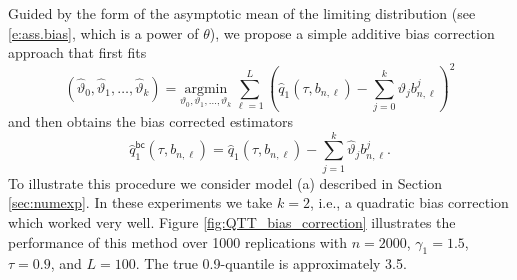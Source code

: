\documentclass[12pt]{amsart}
\newcommand{\1}{\mathbbm{1}}
\newcommand{\0}{\mathbf{0}}
\newcommand{\argmin}{\mathrm{argmin}}
\theoremstyle{plain}
\theoremstyle{definition}
\begin{document}
Guided by the form of the asymptotic mean of the limiting distribution (see \eqref{e:ass.bias}, which is a power of $\theta$), we propose a simple additive bias correction approach that first fits 
%
\begin{equation*}
(\hat\vartheta_0,\hat\vartheta_1,\dots,\hat\vartheta_k)=\underset{\vartheta_0,\vartheta_1,\dots,\vartheta_k}{\argmin}\,\sum_{\ell=1}^L(\hat{q}_{1}(\tau,b_{n,\ell})-\sum_{j=0}^k\vartheta_jb_{n,\ell}^j)^2
\end{equation*}
%
and then obtains the bias corrected estimators
%
\begin{equation}
    \label{eq:debiased_q}
  \hat{q}_{1}^{\mathsf{bc}}(\tau,b_{n,\ell})=  \hat{q}_{1}(\tau,b_{n,\ell})-\sum_{j=1}^k\hat\vartheta_jb_{n,\ell}^j.
\end{equation}
%
To illustrate this procedure we consider model (a)  described in Section \ref{sec:numexp}.  In these experiments we take $k=2$, i.e., a quadratic bias correction which worked very well. Figure \ref{fig:QTT_bias_correction} illustrates the performance of this method over 1000 replications   with $n=2000$, $\gamma_1=1.5$, $\tau=0.9$, and  $L=100$.  The true 0.9-quantile is approximately 3.5.
%
%
%
\end{document}
